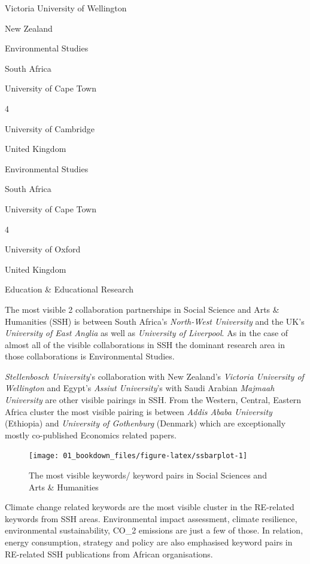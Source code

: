\documentclass[
]{book}
\begin{document}
{Victoria University of Wellington }

{New Zealand }

{Environmental Studies }

{South Africa}

{University of Cape Town}

{4 }

{University of Cambridge }

{United Kingdom}

{Environmental Studies }

{South Africa}

{University of Cape Town}

{4 }

{University of Oxford }

{United Kingdom}

{Education \& Educational Research}

The most visible 2 collaboration partnerships in Social Science and Arts \& Humanities (SSH) is between South Africa's \emph{North-West University} and the UK's \emph{University of East Anglia} as well as \emph{University of Liverpool}. As in the case of almost all of the visible collaborations in SSH the dominant research area in those collaborations is Environmental Studies.

\emph{Stellenbosch University}'s collaboration with New Zealand's \emph{Victoria University of Wellington} and Egypt's \emph{Assiut University}'s with Saudi Arabian \emph{Majmaah University} are other visible pairings in SSH. From the Western, Central, Eastern Africa cluster the most visible pairing is between \emph{Addis Ababa University} (Ethiopia) and \emph{University of Gothenburg} (Denmark) which are exceptionally mostly co-published Economics related papers.

\begin{figure}
\texttt{[image: 01\_bookdown\_files/figure-latex/ssbarplot-1]} \caption{The most visible keywords/ keyword pairs in Social Sciences and Arts & Humanities}\label{fig:ssbarplot}
\end{figure}

Climate change related keywords are the most visible cluster in the RE-related keywords from SSH areas. Environmental impact assessment, climate resilience, environmental sustainability, CO\_2 emissions are just a few of those. In relation, energy consumption, strategy and policy are also emphasised keyword pairs in RE-related SSH publications from African organisations.
\end{document}
